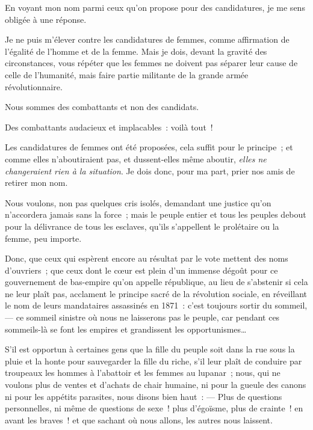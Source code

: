 \documentclass[french,twoside]{book} %
\newcommand{\signed}[1]{\bigbreak\filbreak{\raggedleft #1\par}\medskip}
\newenvironment{quoteblock}%
  {\begin{quoting}}
  {\end{quoting}}
\newenvironment{quotebar}{%
    \def\FrameCommand{{\color{rubric!10!}\vrule width 0.5em} \hspace{0.9em}}%
    \def\OuterFrameSep{\itemsep} %
    \MakeFramed {\advance\hsize-\width \FrameRestore}
  }%
  {%
    \endMakeFramed
  }
\renewenvironment{quoteblock}%
  {%
    \savenotes
    \setstretch{0.9}
    \normalfont
    \begin{quotebar}
  }
  {%
    \end{quotebar}
    \spewnotes
  }
\begin{document}
\begin{quoteblock}
 \noindent En voyant mon nom parmi ceux qu’on propose pour des candidatures, je me sens obligée à une réponse.\par
 Je ne puis m’élever contre les candidatures de femmes, comme affirmation de l’égalité de l’homme et de la femme. Mais je dois, devant la gravité des circonstances, vous répéter que les femmes ne doivent pas séparer leur cause de celle de l’humanité, mais faire partie militante de la grande armée révolutionnaire.\par
 Nous sommes des combattants et non des candidats.\par
 Des combattants audacieux et implacables : voilà tout !\par
 Les candidatures de femmes ont été proposées, cela suffit pour le principe ; et comme elles n’aboutiraient pas, et dussent-elles même aboutir, \emph{elles ne changeraient rien à la situation}. Je dois donc, pour ma part, prier nos amis de retirer mon nom.\par
 Nous voulons, non pas quelques cris isolés, demandant une justice qu’on n’accordera jamais sans la force ; mais le peuple entier et tous les peuples debout pour la délivrance de tous les esclaves, qu’ils s’appellent le prolétaire ou la femme, peu importe.\par
 Donc, que ceux qui espèrent encore au résultat par le vote mettent des noms d’ouvriers ; que ceux dont le cœur est plein d’un immense dégoût pour ce gouvernement de bas-empire qu’on appelle république, au lieu de s’abstenir si cela ne leur plaît pas, acclament le principe sacré de la révolution sociale, en réveillant le nom de leurs mandataires assassinés en 1871 : c’est toujours sortir du sommeil, — ce sommeil sinistre où nous ne laisserons pas le peuple, car pendant ces sommeils-là se font les empires et grandissent les opportunismes…\par
 S’il est opportun à certaines gens que la fille du peuple  soit dans la rue sous la pluie et la honte pour sauvegarder la fille du riche, s’il leur plaît de conduire par troupeaux les hommes à l’abattoir et les femmes au lupanar ; nous, qui ne voulons plus de ventes et d’achats de chair humaine, ni pour la gueule des canons ni pour les appétits parasites, nous disons bien haut : — Plus de questions personnelles, ni même de questions de sexe ! plus d’égoïsme, plus de crainte ! en avant les braves ! et que sachant où nous allons, les autres nous laissent.\par
 

\signed{L{\scshape ouise} M{\scshape ichel}.}
 \end{quoteblock}
\end{document}
